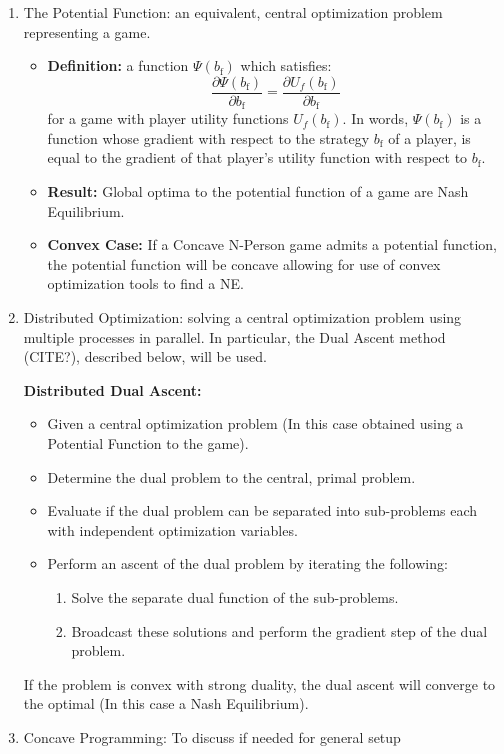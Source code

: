 \documentclass[12pt,a4paper]{report}
\begin{document}
\begin{enumerate}
\begin{itemize}
\end{itemize}
\item The Potential Function: an equivalent, central optimization problem representing a game.
\begin{itemize}
\item
\textbf{Definition:}  a function
$ \Psi(b_{\text{f}})$ which satisfies:
\begin{equation}\label{potential_game_condition}
\frac{\partial \Psi(b_{\text{f}})}{\partial b_{\text{f}}}
 =
 \frac{\partial U_f(b_{\text{f}})}{\partial b_{\text{f}}}
\end{equation} 
for a game with player utility functions $U_f(b_{\text{f}})$.
In words, $ \Psi(b_{\text{f}})$ is a function whose gradient with respect to the strategy $b_{\text{f}}$ of a player, is equal to the gradient of that player's utility function with respect to $b_{\text{f}}$.
\item \textbf{Result:} Global optima to the potential function of a game are Nash Equilibrium.
\item \textbf{Convex Case:} If a Concave N-Person game admits a potential function, the potential function will be concave allowing for use of convex optimization tools to find a NE. 
\end{itemize}



\item Distributed Optimization: solving a central optimization problem using multiple processes in parallel.
In particular, the Dual Ascent method (CITE?), described below, will be used. 

\textbf{Distributed Dual Ascent:} 
\begin{itemize}
\item Given a central optimization problem (In this case obtained using a Potential Function to the game).
\item Determine the dual problem to the central, primal problem.
\item Evaluate if the dual problem can be separated into sub-problems each with independent optimization variables.
\item Perform an ascent of the dual problem by iterating the following:
\begin{enumerate}
\item Solve the separate dual function of the sub-problems.
\item Broadcast these solutions and perform the gradient step of the dual problem.
\end{enumerate}
\end{itemize}

If the problem is convex with strong duality, the dual ascent will converge to the optimal (In this case a Nash Equilibrium).


\item Concave Programming: To discuss if needed for general setup


\end{enumerate}
\end{document}
